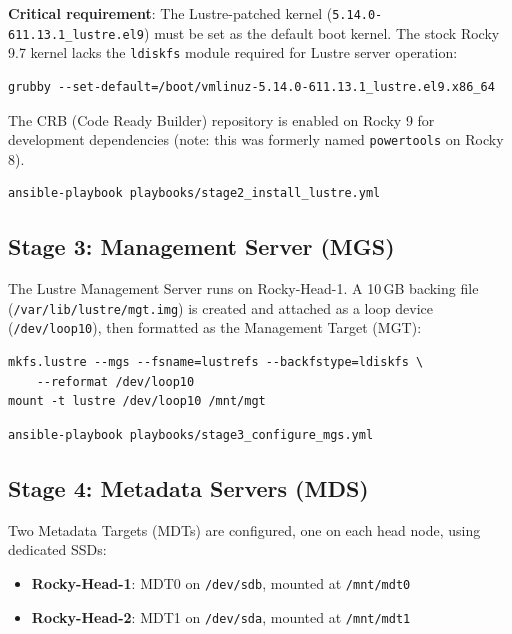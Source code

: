 \textbf{Critical requirement}: The Lustre-patched kernel (\texttt{5.14.0-611.13.1\_lustre.el9}) must be set as the default boot kernel. The stock Rocky 9.7 kernel lacks the \texttt{ldiskfs} module required for Lustre server operation:

\begin{verbatim}
grubby --set-default=/boot/vmlinuz-5.14.0-611.13.1_lustre.el9.x86_64
\end{verbatim}

The CRB (Code Ready Builder) repository is enabled on Rocky 9 for development dependencies (note: this was formerly named \texttt{powertools} on Rocky 8).

\begin{verbatim}
ansible-playbook playbooks/stage2_install_lustre.yml
\end{verbatim}

\subsection{Stage 3: Management Server (MGS)}

The Lustre Management Server runs on Rocky-Head-1. A 10\,GB backing file (\texttt{/var/lib/lustre/mgt.img}) is created and attached as a loop device (\texttt{/dev/loop10}), then formatted as the Management Target (MGT):

\begin{verbatim}
mkfs.lustre --mgs --fsname=lustrefs --backfstype=ldiskfs \
    --reformat /dev/loop10
mount -t lustre /dev/loop10 /mnt/mgt
\end{verbatim}

\begin{verbatim}
ansible-playbook playbooks/stage3_configure_mgs.yml
\end{verbatim}

\subsection{Stage 4: Metadata Servers (MDS)}

Two Metadata Targets (MDTs) are configured, one on each head node, using dedicated SSDs:

\begin{itemize}
    \item \textbf{Rocky-Head-1}: MDT0 on \texttt{/dev/sdb}, mounted at \texttt{/mnt/mdt0}
    \item \textbf{Rocky-Head-2}: MDT1 on \texttt{/dev/sda}, mounted at \texttt{/mnt/mdt1}
\end{itemize}

